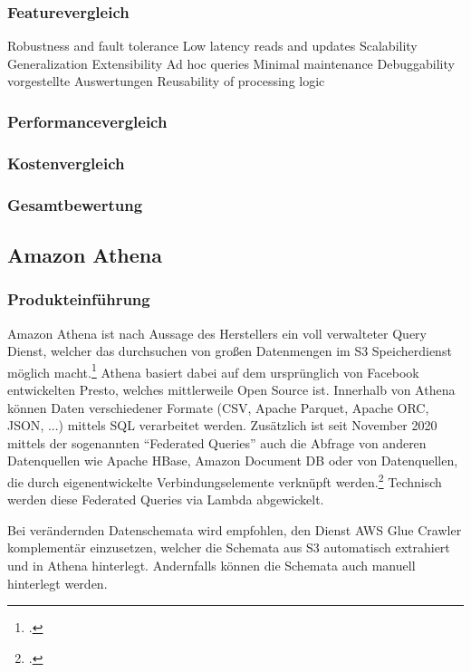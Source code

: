 \subsubsection{Featurevergleich} 
Robustness and fault tolerance
Low latency reads and updates
Scalability
Generalization
Extensibility
Ad hoc queries
Minimal maintenance
Debuggability
vorgestellte Auswertungen 
Reusability of processing logic

\subsubsection{Performancevergleich}

\subsubsection{Kostenvergleich}

\subsubsection{Gesamtbewertung}

\subsection{Amazon Athena}

\subsubsection{Produkteinführung}
Amazon Athena ist nach Aussage des Herstellers ein voll verwalteter Query Dienst, welcher das durchsuchen von großen Datenmengen im \ac{S3} Speicherdienst möglich macht.\footcite[Vgl.][]{Barr.2016} Athena basiert dabei auf dem ursprünglich von Facebook entwickelten Presto, welches mittlerweile Open Source ist. Innerhalb von Athena können Daten verschiedener Formate (\ac{CSV}, Apache Parquet, Apache ORC, \ac{JSON}, ...) mittels \ac{SQL} verarbeitet werden. Zusätzlich ist seit November 2020 mittels der sogenannten \enquote{Federated Queries} auch die Abfrage von anderen Datenquellen wie Apache HBase, Amazon Document DB oder von Datenquellen, die durch eigenentwickelte Verbindungselemente verknüpft werden.\footcite[Vgl.][]{AmazonWebServicesInc..o.J.s} Technisch werden diese Federated Queries via Lambda abgewickelt.



Bei verändernden Datenschemata wird empfohlen, den Dienst \ac{AWS} Glue Crawler komplementär einzusetzen, welcher die Schemata aus \ac{S3} automatisch extrahiert und in Athena hinterlegt. Andernfalls können die Schemata auch manuell hinterlegt werden.

